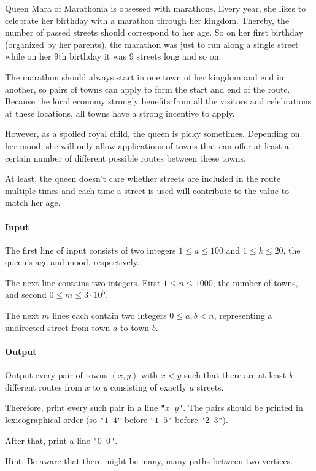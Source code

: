 




Queen Mara of Marathonia is obsessed with marathons. Every year, she likes to celebrate her birthday with a marathon through her kingdom. Thereby, the number of passed streets should correspond to her age. So on her first birthday (organized by her parents), the marathon was just to run along a single street while on her 9th birthday it was 9 streets long and so on.

The marathon should always start in one town of her kingdom and end in another, so pairs of towns can apply to form the start and end of the route. Because the local economy strongly benefits from all the visitors and celebrations at these locations, all towns have a strong incentive to apply.

However, as a spoiled royal child, the queen is picky sometimes. Depending on her mood, she will only allow applications of towns that can offer at least a certain number of different possible routes between these towns.

At least, the queen doesn't care whether streets are included in the route multiple times and each time a street is used will contribute to the value to match her age.

\paragraph*{Input}
The first line of input consists of two integers \(1\le a \le 100\) and \(1\le k \le 20\), the queen's age and mood, respectively.

The next line contains two integers. First \(1 \le n \le 1000\), the number of towns, and second \(0\le m \le 3\cdot 10^5\). 

The next \(m\) lines each contain two integers \(0 \le a,b < n\), representing a undirected street from town \(a\) to town \(b\). 

\paragraph*{Output}
Output every pair of towns \((x,y)\) with \(x < y\) such that there are at least \(k\) different routes from \(x\) to \(y\) consisting of exactly \(a\) streets.

Therefore, print every such pair in a line \texttt{"\(x\) \(y\)"}. The pairs should be printed in lexicographical order (so \texttt{"\(1\) \(4\)"} before \texttt{"\(1\) \(5\)"} before \texttt{"\(2\) \(3\)"}).

After that, print a line \texttt{"\(0\) \(0\)"}.

Hint: Be aware that there might be many, many paths between two vertices.

\begin{samples}
\end{samples}

